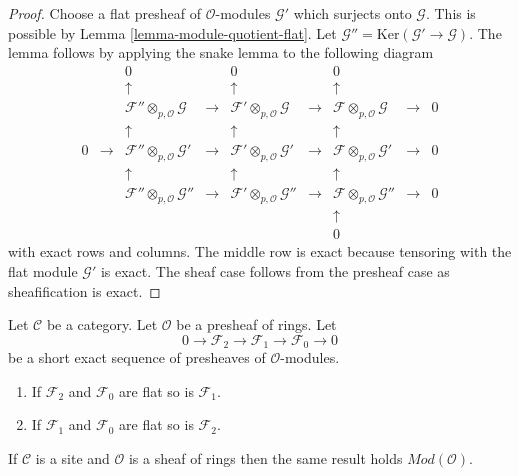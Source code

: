 \begin{proof}
Choose a flat presheaf of $\mathcal{O}$-modules $\mathcal{G}'$
which surjects onto $\mathcal{G}$. This is possible by
Lemma \ref{lemma-module-quotient-flat}. Let
$\mathcal{G}'' = \text{Ker}(\mathcal{G}' \to \mathcal{G})$.
The lemma follows by applying the snake lemma to the following
diagram
$$
\begin{matrix}
 & & 0 & & 0 & & 0 & & \\
 & & \uparrow & & \uparrow & & \uparrow & & \\
 & & \mathcal{F}'' \otimes_{p, \mathcal{O}} \mathcal{G} & \to &
     \mathcal{F}' \otimes_{p, \mathcal{O}} \mathcal{G} & \to &
     \mathcal{F} \otimes_{p, \mathcal{O}} \mathcal{G} & \to & 0 \\
 & & \uparrow & & \uparrow & & \uparrow & & \\
0 & \to & \mathcal{F}'' \otimes_{p, \mathcal{O}} \mathcal{G}' & \to &
          \mathcal{F}' \otimes_{p, \mathcal{O}} \mathcal{G}' & \to &
	  \mathcal{F} \otimes_{p, \mathcal{O}} \mathcal{G}' & \to & 0 \\
 & & \uparrow & & \uparrow & & \uparrow & & \\
 & & \mathcal{F}'' \otimes_{p, \mathcal{O}} \mathcal{G}'' & \to &
     \mathcal{F}' \otimes_{p, \mathcal{O}} \mathcal{G}'' & \to &
     \mathcal{F} \otimes_{p, \mathcal{O}} \mathcal{G}'' & \to & 0 \\
 & & & & & & \uparrow & & \\
 & & & & & & 0 & &
\end{matrix}
$$
with exact rows and columns. The middle row is exact because tensoring
with the flat module $\mathcal{G}'$ is exact.
The sheaf case follows from the presheaf case as sheafification is
exact.
\end{proof}

\begin{lemma}
\label{lemma-flat-ses}
Let $\mathcal{C}$ be a category.
Let $\mathcal{O}$ be a presheaf of rings.
Let
$$
0 \to
\mathcal{F}_2 \to
\mathcal{F}_1 \to
\mathcal{F}_0 \to 0
$$
be a short exact sequence of presheaves of $\mathcal{O}$-modules.
\begin{enumerate}
\item If $\mathcal{F}_2$ and $\mathcal{F}_0$ are flat so is
$\mathcal{F}_1$.
\item If $\mathcal{F}_1$ and $\mathcal{F}_0$ are flat so is
$\mathcal{F}_2$.
\end{enumerate}
If $\mathcal{C}$ is a site and $\mathcal{O}$ is a
sheaf of rings then the same result holds $\textit{Mod}(\mathcal{O})$.
\end{lemma}

